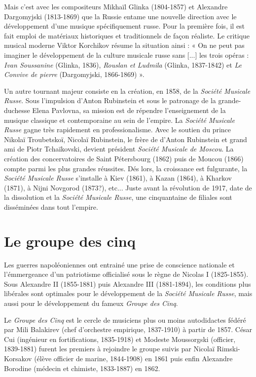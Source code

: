 Mais c'est avec les compositeurs Mikhaïl Glinka (1804-1857) et Alexandre Dargomyjski (1813-1869) que la Russie entame une nouvelle direction avec le développement d'une musique spécifiquement russe. Pour la première fois, il est fait emploi de matériaux historiques et traditionnels de façon réaliste. Le critique musical moderne Viktor Korchikov résume la situation ainsi : « On ne peut pas imaginer le développement de la culture musicale russe sans [...] les trois opéras : \emph{Ivan Soussanine} (Glinka, 1836), \emph{Rouslan et Ludmila} (Glinka, 1837-1842) et \emph{Le Convive de pierre} (Dargomyjski, 1866-1869) ».

Un autre tournant majeur consiste en la création, en 1858, de la \emph{Société Musicale Russe}. Sous l'impulsion d'Anton Rubinstein et sous le patronage de la grande-duchesse Elena Pavlovna, sa mission est de répendre l'enseignement de la musique classique et contemporaine au sein de l'empire. La \emph{Société Musicale Russe} gagne très rapidement en professionalisme. Avec le soutien du prince Nikolaï Troubetskoï, Nicolaï Rubinstein, le frère de d'Anton Rubinstein et grand ami de Piotr Tchaïkovski, devient président \emph{Société Musicale de Moscou}. La création des concervatoires de Saint Pétersbourg (1862) puis de Moucou (1866) compte parmi les plus grandes réussites. Dés lors, la croissance est fulgurante, la \emph{Société Musicale Russe} s'installe à Kiev (1861), à Kazan (1864), à Kharkov (1871), à Nijni Novgorod (1873?), etc... Juste avant la révolution de 1917, date de la dissolution et la \emph{Société Musicale Russe}, une cinquantaine de filiales sont disséminées dans tout l'empire. 

\section{Le groupe des cinq}

Les guerres napoléoniennes ont entrainé une prise de conscience nationale et l'émmergeance d'un patriotisme officialisé sous le règne de Nicolas I\ier{} (1825-1855).  Sous Alexandre II (1855-1881) puis Alexandre III (1881-1894), les conditions plus libérales sont optimales pour le développement de la \emph{Société Musicale Russe}, mais aussi pour le développement du fameux \emph{Groupe des Cinq}.

Le \emph{Groupe des Cinq} est le cercle de musiciens plus ou moins autodidactes fédéré par Mili Balakirev (chef d'orchestre empirique, 1837-1910) à partir de 1857. César Cui (ingénieur en fortifications, 1835-1918) et Modeste Moussorgski (officier, 1839-1881) furent les premiers à rejoindre le groupe suivis par Nicolaï Rimski-Korsakov (élève officier de marine, 1844-1908) en 1861 puis enfin Alexandre Borodine (médecin et chimiste, 1833-1887) en 1862.

